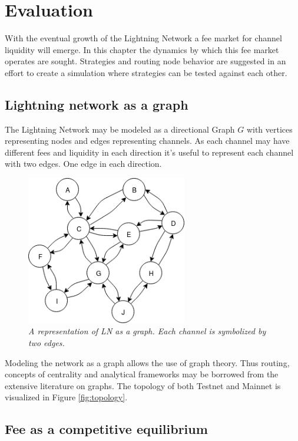 \chapter{Evaluation}

With the eventual growth of the Lightning Network a fee market for channel liquidity will emerge. In this chapter the dynamics by which this fee market operates are sought. Strategies and routing node behavior are suggested in an effort to create a simulation where strategies can be tested against each other. 

\section{Lightning network as a graph}

The Lightning Network may be modeled as a directional Graph $G$ with vertices representing nodes and edges representing channels. As each channel may have different fees and liquidity in each direction it's useful to represent each channel with two edges. One edge in each direction. 

\begin{figure}[!htb]
	\hspace*{-0.7cm} 
	\centering
	\includegraphics[width=7cm]{images/LN_overview.png}
	\caption{ \textit{A representation of LN as a graph. Each channel is symbolized by two edges.} 
	}
	\label{fig:ln:graph}
	\hspace*{2mm}
\end{figure}

Modeling the network as a graph allows the use of graph theory. Thus routing, concepts of centrality and analytical frameworks may be borrowed from the extensive literature on graphs. The topology of both Testnet and Mainnet is visualized in Figure \ref{fig:topology}.

\section{Fee as a competitive equilibrium}

